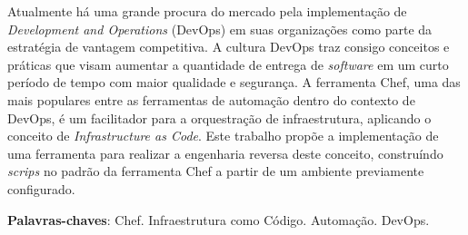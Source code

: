 \begin{resumo}
  Atualmente há uma grande procura do mercado pela implementação de
  \textit{Development and Operations} (DevOps) em suas organizações como parte da estratégia de vantagem
  competitiva. A cultura DevOps traz consigo conceitos e práticas
  que visam aumentar a quantidade de entrega de \textit{software} em um
  curto período de tempo com maior qualidade e segurança. A
  ferramenta Chef, uma das mais populares entre as ferramentas de
  automação dentro do contexto de DevOps, é um facilitador para
  a orquestração de infraestrutura, aplicando o conceito de
  \textit{Infrastructure as Code}.
  Este trabalho propõe a implementação de uma ferramenta para realizar a 
  engenharia reversa deste conceito, construíndo \textit{scrips} no padrão da 
  ferramenta Chef a partir de um ambiente previamente configurado.

 \vspace{\onelineskip}
 \noindent
    \textbf{Palavras-chaves}: Chef. Infraestrutura como Código. Automação. DevOps.
\end{resumo}
